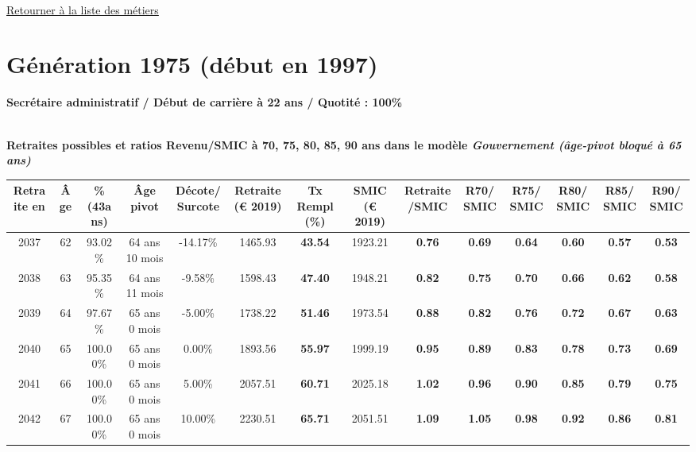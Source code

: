 ~\\ 
 
 \hyperlink{page.2}{\noindent Retourner à la liste des métiers}

 \newpage 

\section{Génération 1975 (début en 1997)\label{SecretaireAdmin_100_1975_22_0}} 
 
{\bf \noindent Secrétaire administratif / Début de carrière à 22 ans / Quotité : 100\%}  ~ 

 ~\\{\bf \noindent Retraites possibles et ratios Revenu/SMIC à 70, 75, 80, 85, 90 ans dans le modèle \emph{Gouvernement (âge-pivot bloqué à 65 ans)}}  
 
\begin{adjustbox}{max width=\textwidth} 
\begin{tabular}[htb]{|c|c||c|c|c||c|c||c|c||c|c|c|c|c|} 
\hline 
 Retraite en &  Âge &  \%(43ans) &  Âge pivot &  Décote/Surcote &  Retraite (\euro{} 2019) &  Tx Rempl(\%) &  SMIC (\euro{} 2019) &  Retraite/SMIC &  R70/SMIC &  R75/SMIC &  R80/SMIC &  R85/SMIC &  R90/SMIC \\ 
\hline \hline 
 2037 &  62 &  93.02\% &  64 ans 10 mois &  -14.17\% &  1465.93 &  {\bf 43.54} &  1923.21 &  {\bf {\color{red} 0.76}} &  {\bf {\color{red} 0.69}} &  {\bf {\color{red} 0.64}} &  {\bf {\color{red} 0.60}} &  {\bf {\color{red} 0.57}} &  {\bf {\color{red} 0.53}} \\ 
\hline 
 2038 &  63 &  95.35\% &  64 ans 11 mois &  -9.58\% &  1598.43 &  {\bf 47.40} &  1948.21 &  {\bf {\color{red} 0.82}} &  {\bf {\color{red} 0.75}} &  {\bf {\color{red} 0.70}} &  {\bf {\color{red} 0.66}} &  {\bf {\color{red} 0.62}} &  {\bf {\color{red} 0.58}} \\ 
\hline 
 2039 &  64 &  97.67\% &  65 ans 0 mois &  -5.00\% &  1738.22 &  {\bf 51.46} &  1973.54 &  {\bf {\color{red} 0.88}} &  {\bf {\color{red} 0.82}} &  {\bf {\color{red} 0.76}} &  {\bf {\color{red} 0.72}} &  {\bf {\color{red} 0.67}} &  {\bf {\color{red} 0.63}} \\ 
\hline 
 2040 &  65 &  100.00\% &  65 ans 0 mois &  0.00\% &  1893.56 &  {\bf 55.97} &  1999.19 &  {\bf {\color{red} 0.95}} &  {\bf {\color{red} 0.89}} &  {\bf {\color{red} 0.83}} &  {\bf {\color{red} 0.78}} &  {\bf {\color{red} 0.73}} &  {\bf {\color{red} 0.69}} \\ 
\hline 
 2041 &  66 &  100.00\% &  65 ans 0 mois &  5.00\% &  2057.51 &  {\bf 60.71} &  2025.18 &  {\bf 1.02} &  {\bf {\color{red} 0.96}} &  {\bf {\color{red} 0.90}} &  {\bf {\color{red} 0.85}} &  {\bf {\color{red} 0.79}} &  {\bf {\color{red} 0.75}} \\ 
\hline 
 2042 &  67 &  100.00\% &  65 ans 0 mois &  10.00\% &  2230.51 &  {\bf 65.71} &  2051.51 &  {\bf 1.09} &  {\bf 1.05} &  {\bf {\color{red} 0.98}} &  {\bf {\color{red} 0.92}} &  {\bf {\color{red} 0.86}} &  {\bf {\color{red} 0.81}} \\ 
\hline 
\hline 
\end{tabular} 
\end{adjustbox} 
 

